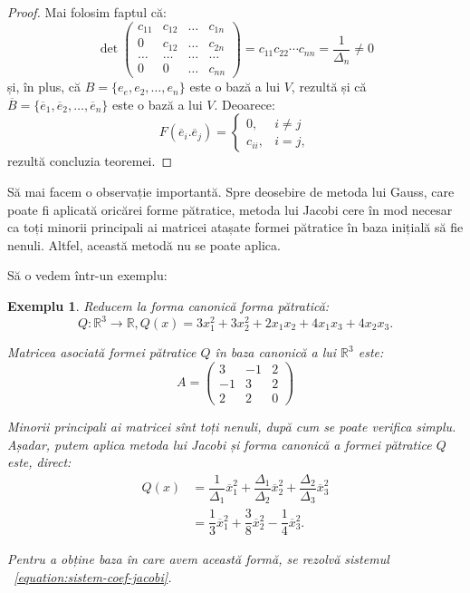 \documentclass[11pt,a4paper]{article}
\theoremstyle{dotless}
\theoremstyle{dotlessdr}
\newtheorem{example}{Exemplu}[section]
\begin{document}
\begin{proof}
Mai folosim faptul că: 
 \[
	\det \begin{pmatrix}
	          c_{11} & c_{12} & \dots & c_{1n} \\
	          0 & c_{12} & \dots & c_{2n} \\
	          \dots & \dots & \dots & \dots \\
	          0 & 0 & \dots & c_{nn}
         \end{pmatrix} = c_{11} c_{22} \cdots c_{nn} = \dfrac{1}{\Delta_n} 
    \neq 0
\]
și, în plus, că $B = \{e_e, e_2, \dots, e_n\}$ este o bază a lui $V$, rezultă și
că $\overline{B} = \{\overline{e}_1, \overline{e}_2, \dots, \overline{e}_n \}$
este o bază a lui $V$. Deoarece: 
 \[
	F(\overline{e}_i. \overline{e}_j) = \begin{cases}	
	                                        0, & i \neq j \\
	                                        c_{ii}, & i = j,
                                         \end{cases}
\]
rezultă concluzia teoremei.
\end{proof}

Să mai facem o observație importantă. Spre deosebire de metoda lui Gauss, care
poate fi aplicată oricărei forme pătratice, metoda lui Jacobi cere în mod 
necesar ca toți minorii principali ai matricei atașate formei pătratice în baza
inițială să fie nenuli. Altfel, această metodă nu se poate aplica.

Să o vedem într-un exemplu:
\begin{example}
	Reducem la forma canonică forma pătratică: 
 \[
	Q : \mathbb{R}^3 \to \mathbb{R}, 
	Q(x) = 3x_1^2 + 3x_2^2 + 2x_1 x_2 + 4x_1x_3 + 4x_2x_3.
\]

Matricea asociată formei pătratice $Q$ în baza canonică a lui $\mathbb{R}^3$
este: 
 \[
	A = \begin{pmatrix}
	        3 & -1 & 2 \\
	        -1 & 3 & 2 \\
	        2 & 2 & 0
        \end{pmatrix}
\]

Minorii principali ai matricei sînt toți nenuli, după cum se poate verifica
simplu. Așadar, putem aplica metoda lui Jacobi și forma canonică a formei 
pătratice $Q$ este, direct:
\begin{align*}
	Q(x) &= \dfrac{1}{\Delta_1} \overline{x}_1^2 + \dfrac{\Delta_1}{\Delta_2}
	        \overline{x}_2^2 + \dfrac{\Delta_2}{\Delta_3} \overline{x}_3^2 \\
	     &= \dfrac{1}{3} \overline{x}_1^2 + \dfrac{3}{8} \overline{x}_2^2 -
	        \dfrac{1}{4} \overline{x}_3^2.
\end{align*}

Pentru a obține baza în care avem această formă, se rezolvă sistemul
~\eqref{equation:sistem-coef-jacobi}.
\end{example}
\end{document}
